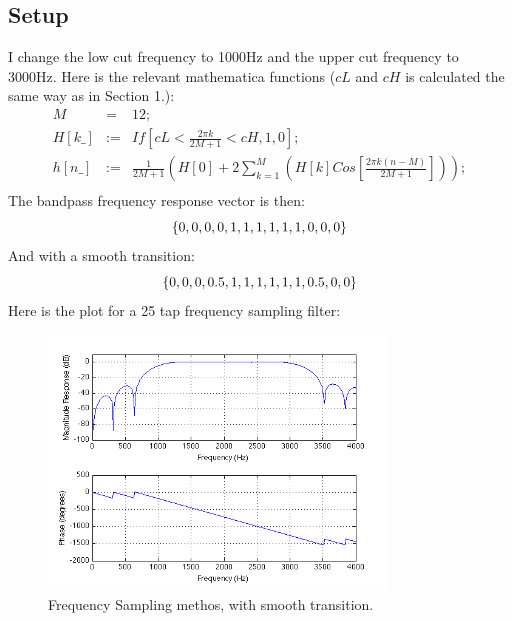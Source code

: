 \documentclass[a4wide,10pt]{article}
\begin{document}
		\subsection{Setup} %
		\label{sub:setup}
			I change the low cut frequency to 1000Hz and the upper cut frequency to 3000Hz. Here is the relevant mathematica functions ($cL$ and $cH$ is calculated the same way as in Section 1.):
			\begin{eqnarray}
				M &=& 12; \nonumber \\
				H[k\_] &:=& If[cL < \frac{2 \pi k}{2 M +1} < cH, 1, 0];  \nonumber \\
				h[n\_] &:=& \frac{1}{2M +1} (H[0] + 2 \sum\limits_{k=1}^M (H[k] Cos[\frac{2\pi k(n-M)}{2M+1}])); \nonumber \\
			\end{eqnarray}
			The bandpass frequency response vector is then:
			\begin{equation}
				\{0, 0, 0, 0, 1, 1, 1, 1, 1, 1, 0, 0, 0\} \nonumber \\
			\end{equation}
			And with a smooth transition:
			\begin{equation}
				\{0, 0, 0, 0.5, 1, 1, 1, 1, 1, 1, 0.5, 0, 0\} \nonumber \\
			\end{equation}
			Here is the plot for a 25 tap frequency sampling filter:
			\begin{figure}[h]
				\centering
					\includegraphics[width=9cm]{images/opgave_3_a_1.png}
				\caption{Frequency Sampling methos, with smooth transition.}
				\label{fig:images_opgave_3_a_1}
			\end{figure}
\newpage
\end{document}
